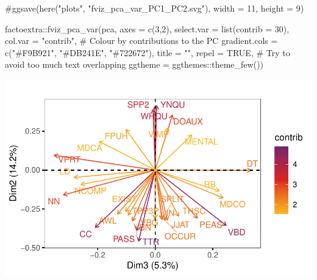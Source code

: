\documentclass[
  letterpaper,
  DIV=11,
  numbers=noendperiod]{scrreprt}
\newenvironment{Shaded}{\begin{snugshade}}{\end{snugshade}}
\newcommand{\AttributeTok}[1]{\textcolor[rgb]{0.40,0.45,0.13}{#1}}
\newcommand{\CommentTok}[1]{\textcolor[rgb]{0.37,0.37,0.37}{#1}}
\newcommand{\ConstantTok}[1]{\textcolor[rgb]{0.56,0.35,0.01}{#1}}
\newcommand{\DecValTok}[1]{\textcolor[rgb]{0.68,0.00,0.00}{#1}}
\newcommand{\FunctionTok}[1]{\textcolor[rgb]{0.28,0.35,0.67}{#1}}
\newcommand{\NormalTok}[1]{\textcolor[rgb]{0.00,0.23,0.31}{#1}}
\newcommand{\SpecialCharTok}[1]{\textcolor[rgb]{0.37,0.37,0.37}{#1}}
\newcommand{\StringTok}[1]{\textcolor[rgb]{0.13,0.47,0.30}{#1}}
\begin{document}
\begin{Shaded}
\begin{Highlighting}[]
\CommentTok{\#ggsave(here("plots", "fviz\_pca\_var\_PC1\_PC2.svg"), width = 11, height = 9)}

\NormalTok{factoextra}\SpecialCharTok{::}\FunctionTok{fviz\_pca\_var}\NormalTok{(pca,}
             \AttributeTok{axes =} \FunctionTok{c}\NormalTok{(}\DecValTok{3}\NormalTok{,}\DecValTok{2}\NormalTok{),}
             \AttributeTok{select.var =} \FunctionTok{list}\NormalTok{(}\AttributeTok{contrib =} \DecValTok{30}\NormalTok{),}
             \AttributeTok{col.var =} \StringTok{"contrib"}\NormalTok{, }\CommentTok{\# Colour by contributions to the PC}
             \AttributeTok{gradient.cols =} \FunctionTok{c}\NormalTok{(}\StringTok{"\#F9B921"}\NormalTok{, }\StringTok{"\#DB241E"}\NormalTok{, }\StringTok{"\#722672"}\NormalTok{),}
             \AttributeTok{title =} \StringTok{""}\NormalTok{,}
             \AttributeTok{repel =} \ConstantTok{TRUE}\NormalTok{, }\CommentTok{\# Try to avoid too much text overlapping}
             \AttributeTok{ggtheme =}\NormalTok{ ggthemes}\SpecialCharTok{::}\FunctionTok{theme\_few}\NormalTok{())}
\end{Highlighting}
\end{Shaded}

\includegraphics{E_Ch6_Analysis_files/figure-pdf/graphs-of-variables-2.pdf}
\end{document}
